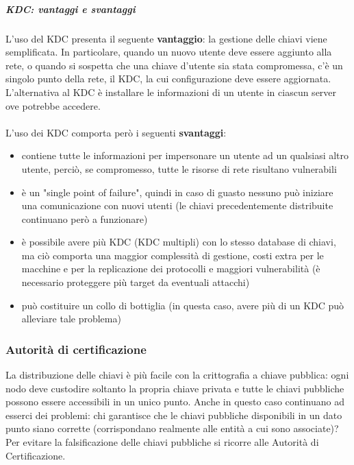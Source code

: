 \subparagraph{KDC: vantaggi e svantaggi}
L'uso del KDC presenta il seguente \textbf{vantaggio}: la gestione delle chiavi viene semplificata. In particolare, quando un nuovo utente deve essere aggiunto alla rete, o quando si sospetta che una chiave d'utente sia stata compromessa, c'è un singolo punto della rete, il KDC, la cui configurazione deve essere aggiornata. L'alternativa al KDC è installare le informazioni di un utente in ciascun server ove potrebbe accedere. \\ \\
L'uso dei KDC comporta però i seguenti \textbf{svantaggi}: 
\begin{itemize}
	\item contiene tutte le informazioni per impersonare un utente ad un qualsiasi altro utente, perciò, se compromesso, tutte le risorse di rete risultano vulnerabili
	\item è un "single point of failure", quindi in caso di guasto nessuno può iniziare una comunicazione con nuovi utenti (le chiavi precedentemente distribuite continuano però a funzionare)
	\item è possibile avere più KDC (KDC multipli) con lo stesso database di chiavi, ma ciò comporta una maggior complessità di gestione, costi extra per le macchine e per la replicazione dei protocolli e maggiori vulnerabilità (è necessario proteggere più target da eventuali attacchi)
	\item può costituire un collo di bottiglia (in questa caso, avere più di un KDC può alleviare tale problema)
\end{itemize}  

\subsubsection{Autorità di certificazione}
La distribuzione delle chiavi è più facile con la crittografia a chiave pubblica: ogni nodo deve custodire soltanto la propria chiave privata e tutte le chiavi pubbliche possono essere accessibili in un unico punto. Anche in questo caso continuano ad esserci dei problemi: chi garantisce che le chiavi pubbliche disponibili in un dato punto siano corrette (corrispondano realmente alle entità a cui sono associate)? Per evitare la falsificazione delle chiavi pubbliche si ricorre alle Autorità di Certificazione. \\

